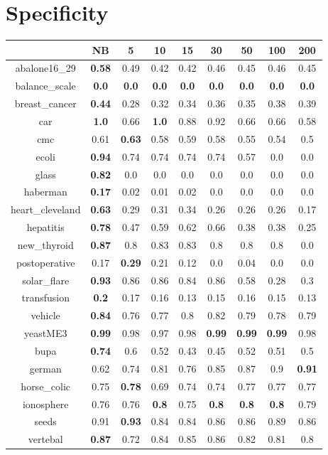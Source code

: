 \documentclass{article}%
\begin{document}
%
\section*{Specificity}%
\begin{tabular}{c|cccccccc}%
\hline%
&NB&5&10&15&30&50&100&200\\%
\hline%
abalone16\_29&\textbf{0.58}&0.49&0.42&0.42&0.46&0.45&0.46&0.45\\%
\hline%
balance\_scale&\textbf{0.0}&\textbf{0.0}&\textbf{0.0}&\textbf{0.0}&\textbf{0.0}&\textbf{0.0}&\textbf{0.0}&\textbf{0.0}\\%
\hline%
breast\_cancer&\textbf{0.44}&0.28&0.32&0.34&0.36&0.35&0.38&0.39\\%
\hline%
car&\textbf{1.0}&0.66&\textbf{1.0}&0.88&0.92&0.66&0.66&0.58\\%
\hline%
cmc&0.61&\textbf{0.63}&0.58&0.59&0.58&0.55&0.54&0.5\\%
\hline%
ecoli&\textbf{0.94}&0.74&0.74&0.74&0.74&0.57&0.0&0.0\\%
\hline%
glass&\textbf{0.82}&0.0&0.0&0.0&0.0&0.0&0.0&0.0\\%
\hline%
haberman&\textbf{0.17}&0.02&0.01&0.02&0.0&0.0&0.0&0.0\\%
\hline%
heart\_cleveland&\textbf{0.63}&0.29&0.31&0.34&0.26&0.26&0.26&0.17\\%
\hline%
hepatitis&\textbf{0.78}&0.47&0.59&0.62&0.66&0.38&0.38&0.25\\%
\hline%
new\_thyroid&\textbf{0.87}&0.8&0.83&0.83&0.8&0.8&0.8&0.0\\%
\hline%
postoperative&0.17&\textbf{0.29}&0.21&0.12&0.0&0.04&0.0&0.0\\%
\hline%
solar\_flare&\textbf{0.93}&0.86&0.86&0.84&0.86&0.58&0.28&0.3\\%
\hline%
transfusion&\textbf{0.2}&0.17&0.16&0.13&0.15&0.16&0.15&0.13\\%
\hline%
vehicle&\textbf{0.84}&0.76&0.77&0.8&0.82&0.79&0.78&0.79\\%
\hline%
yeastME3&\textbf{0.99}&0.98&0.97&0.98&\textbf{0.99}&\textbf{0.99}&\textbf{0.99}&0.98\\%
\hline%
bupa&\textbf{0.74}&0.6&0.52&0.43&0.45&0.52&0.51&0.5\\%
\hline%
german&0.62&0.74&0.81&0.76&0.85&0.87&0.9&\textbf{0.91}\\%
\hline%
horse\_colic&0.75&\textbf{0.78}&0.69&0.74&0.74&0.77&0.77&0.77\\%
\hline%
ionosphere&0.76&0.76&\textbf{0.8}&0.75&\textbf{0.8}&\textbf{0.8}&\textbf{0.8}&0.79\\%
\hline%
seeds&0.91&\textbf{0.93}&0.84&0.84&0.86&0.86&0.89&0.86\\%
\hline%
vertebal&\textbf{0.87}&0.72&0.84&0.85&0.86&0.82&0.81&0.8\\%
\hline%
\end{tabular}
\end{document}
